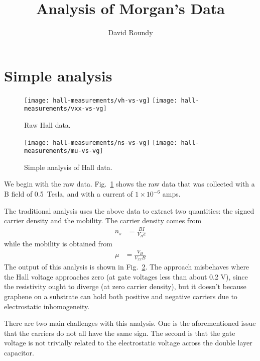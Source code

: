 \documentclass[twocolumn]{revtex4-1}
\begin{document}
\title{Analysis of Morgan's Data}
\author{David Roundy}

\maketitle

\section{Simple analysis}

\begin{figure}
  \texttt{[image: hall-measurements/vh-vs-vg]}
  \texttt{[image: hall-measurements/vxx-vs-vg]}
  \caption{Raw Hall data.}
  \label{fig:raw-data}
\end{figure}

\begin{figure}
  \texttt{[image: hall-measurements/ns-vs-vg]}
  \texttt{[image: hall-measurements/mu-vs-vg]}
  \caption{Simple analysis of Hall data.}
  \label{fig:simple-analysis}
\end{figure}

We begin with the raw data.  Fig.~\ref{fig:raw-data} shows the raw
data that was collected with a B field of 0.5~Tesla, and with a
current of $1\times 10^{-6}$ amps.

The traditional analysis uses the above data to extract two
quantities: the signed carrier density and the mobility.  The carrier
density comes from
\begin{align}
  n_s &= \frac{BI}{V_He}\label{eq:ns}
\end{align}
while the mobility is obtained from
\begin{align}
  \mu &= \frac{V_H}{V_{xx}B}\label{eq:mu}
\end{align}
The output of this analysis is shown in
Fig.~\ref{fig:simple-analysis}.  The approach misbehaves where the
Hall voltage approaches zero (at gate voltages less than about 0.2 V),
since the resistivity ought to diverge (at zero carrier density), but
it doesn't because graphene on a substrate can hold both positive and
negative carriers due to electrostatic inhomogeneity.

There are two main challenges with this analysis.  One is the
aforementioned issue that the carriers do not all have the same sign.
The second is that the gate voltage is not trivially related to the
electrostatic voltage across the double layer capacitor.
\end{document}
